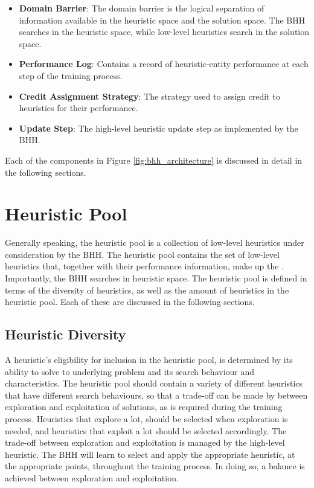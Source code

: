 \begin{itemize}
      \item \textbf{Domain Barrier}: The domain barrier is the logical separation of information available in the heuristic space and the solution space. The \acs{BHH} searches in the heuristic space, while low-level heuristics search in the solution space.

      \item \textbf{Performance Log}: Contains a record of heuristic-entity performance at each step of the training process.

      \item \textbf{Credit Assignment Strategy}: The strategy used to assign credit to heuristics for their performance.

      \item \textbf{Update Step}: The high-level heuristic update step as implemented by the \acs{BHH}.
\end{itemize}

Each of the components in Figure \ref{fig:bhh_architecture} is discussed in detail in the following sections.

\section{Heuristic Pool}\label{sec:bhh:heuristic_pool}

Generally speaking, the heuristic pool is a collection of low-level heuristics under consideration by the \acs{BHH}. The heuristic pool contains the set of low-level heuristics that, together with their performance information, make up the . Importantly, the \acs{BHH} searches in heuristic space. The heuristic pool is defined in terms of the diversity of heuristics, as well as the amount of heuristics in the heuristic pool. Each of these are discussed in the following sections.

\subsection{Heuristic Diversity}\label{sec:bhh:heuristic_pool:diversity}

A heuristic's eligibility for inclusion in the heuristic pool, is determined by its ability to solve to underlying problem and its search behaviour and characteristics. The heuristic pool should contain a variety of different heuristics that have different search behaviours, so that a trade-off can be made by between exploration and exploitation of solutions, as is required during the training process. Heuristics that explore a lot, should be selected when exploration is needed, and heuristics that exploit a lot should be selected accordingly. The trade-off between exploration and exploitation is managed by the high-level heuristic. The \acs{BHH} will learn to select and apply the appropriate heuristic, at the appropriate points, throughout the training process. In doing so, a balance is achieved between exploration and exploitation.

